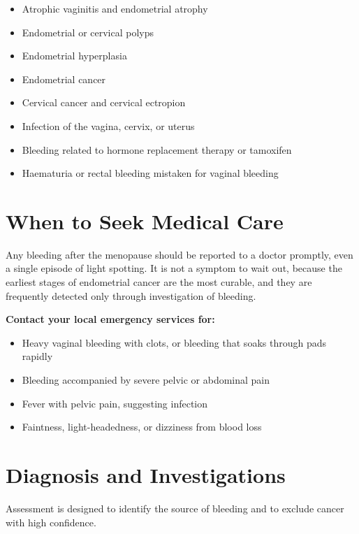 \begin{itemize}
    \item Atrophic vaginitis and endometrial atrophy
    \item Endometrial or cervical polyps
    \item Endometrial hyperplasia
    \item Endometrial cancer
    \item Cervical cancer and cervical ectropion
    \item Infection of the vagina, cervix, or uterus
    \item Bleeding related to hormone replacement therapy or tamoxifen
    \item Haematuria or rectal bleeding mistaken for vaginal bleeding
\end{itemize}

\section*{When to Seek Medical Care}
Any bleeding after the menopause should be reported to a doctor promptly, even a single episode of light spotting. It is not a symptom to wait out, because the earliest stages of endometrial cancer are the most curable, and they are frequently detected only through investigation of bleeding.

\textbf{Contact your local emergency services for:}
\begin{itemize}
    \item Heavy vaginal bleeding with clots, or bleeding that soaks through pads rapidly
    \item Bleeding accompanied by severe pelvic or abdominal pain
    \item Fever with pelvic pain, suggesting infection
    \item Faintness, light-headedness, or dizziness from blood loss
\end{itemize}

\section*{Diagnosis and Investigations}
Assessment is designed to identify the source of bleeding and to exclude cancer with high confidence.

